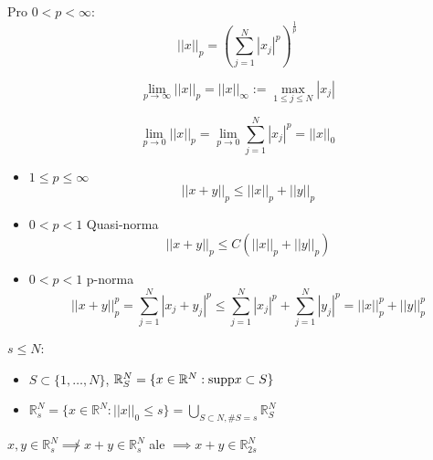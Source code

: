 \documentclass[../main.tex]{subfiles}
\begin{document}
\begin{notation}
    Pro $0<p<\infty$: 
    \begin{equation}
        ||x||_p = \left( \sum_{j=1}^{N} |x_j|^p \right)^\frac{1}{p}
    \end{equation}

    \begin{equation}
        \lim_{p\rightarrow\infty} ||x||_p = ||x||_\infty := \max_{1\leq j \leq N} |x_j|
    \end{equation}

    \begin{equation}
        \lim_{p\rightarrow 0} ||x||_p = \lim_{p\rightarrow0} \sum_{j=1}^{N} |x_j|^p = ||x||_0
    \end{equation}

    \begin{itemize}
        \item $1\leq p\leq \infty$\begin{equation}
            ||x+y||_p \leq ||x||_p + ||y||_p 
        \end{equation}
        \item $0<p<1$ Quasi-norma\begin{equation}
            ||x+y||_p \leq C\left(||x||_p + ||y||_p\right)
        \end{equation}
        \item $0<p<1$ p-norma \begin{equation}
            ||x+y||_p^p = \sum_{j=1}^{N} |x_j + y_j|^p \leq \sum_{j=1}^{N} |x_j|^p + \sum_{j=1}^{N} |y_j|^p = ||x||_p^p + ||y||_p^p
        \end{equation}
    \end{itemize}

    $s\leq N$:
    \begin{itemize}
        \item $S \subset \{1,\dots,N\}$, $\mathbb{R}^N_S = \{x\in \mathbb{R}^N: \text{supp} x \subset S\}$
        \item $\mathbb{R}_s^N = \{x\in \mathbb{R}^N: ||x||_0 \leq s \} = \bigcup_{S\subset N, \#S=s} \mathbb{R}_S^N$
    \end{itemize}

    $x, y \in \mathbb{R}^N_s \not\implies x+y\in \mathbb{R}_s^N$ ale $\implies x+y\in \mathbb{R}_{2s}^N$
\end{notation}
\end{document}
